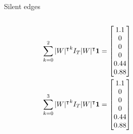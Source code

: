 \begin{frame}{Silent edges}
\begin{columns}
\begin{column}{0.5\textwidth}
{\begin{subequations}
\begin{align*}
\sum_{k=0}^2 {|W|^\intercal}^k
I_T |W|^\intercal \boldsymbol{1}
&=
\begin{bmatrix} 
1.1 \\
0 \\
0 \\
0 \\
0.44 \\
0.88 \\
\end{bmatrix}
\\
\sum_{k=0}^3 {|W|^\intercal}^k
I_T |W|^\intercal \boldsymbol{1}
&=
\begin{bmatrix} 
1.1 \\
0 \\
0 \\
0 \\
0.44 \\
0.88 \\
\end{bmatrix}
\end{align*}
\end{subequations}
}
\end{column}
\begin{column}{0.5\textwidth}

\end{column}
\end{columns}
\end{frame}

